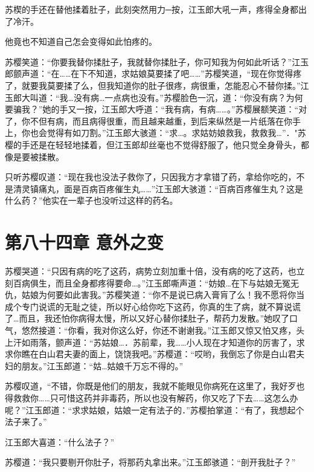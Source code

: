 \documentclass[12pt,oneside]{book}
\begin{document}
苏楔的手还在替他揉着肚子，此刻突然用力─按，江玉郎大吼一声，疼得全身都出了冷汗。

他竟也不知道自己怎会变得如此怕疼的。

苏樱笑道：``你要我替你揉肚子，我就替你揉肚子，你可知我为何如此听话？''江玉郎颤声道：``在\ldots\ldots 在下不知道，求姑娘莫要揉了吧\ldots\ldots{}''苏樱笑道，``现在你觉得疼了，就要我莫要揉了么，但我知道你的肚子很疼，病很重，怎能忍心不替你揉。''江玉郎大叫道：``我\ldots 没有病\ldots 一点病也没有。''苏樱脸色一沉，道：``你没有病？为何要骗我？''她的手又一按，江玉郎大呼道：``我有病，有病\ldots\ldots。''苏樱展额笑道：``对了，你不但有病，而且病得很重，而且越来越重，到后来纵然是一片纸落在你手上，你也会觉得有如刀割。''江玉郎大骇道：``求\ldots。求姑妨娘救我，救救我\ldots{}''．"苏樱的手还是在轻轻地揉着，但江玉郎却丝毫也不觉得舒服了，他只觉全身骨头，都像是要被揉散。

只听苏樱叹道：``现在我也没法子救你了，只因我方才拿错了药，拿给你吃的，不是清灵镇痛丸，面是百病百疼催生丸\ldots\ldots{}''江玉郎大骇道：``百病百疼催生丸？这是什么药？''他实在一辈子也没听过这样的药名。

\hypertarget{ux7b2cux516bux5341ux56dbux7ae0-ux610fux5916ux4e4bux53d8}{%
\chapter{第八十四章
意外之变}\label{ux7b2cux516bux5341ux56dbux7ae0-ux610fux5916ux4e4bux53d8}}

苏樱哭道：``只因有病的吃了这药，病势立刻加重十倍，没有病的吃了这药，也立刻百病俱生，而且全身都疼得要命\ldots。''江玉郎嘶声道：``妨娘\ldots 在下与姑娘无冤无仇，姑娘为何要如此害我。''苏樱笑道：``你不是说已病入膏肓了么！我不愿将你当成个专门说谎的无耻之徒，所以好心给你吃下这药，你真的生了病，就不算说谎了\ldots 而且，我还怕你病得太慢，所以又好心替你揉肚子，帮药力发散。''她叹了口气，悠然接道：``你看，我对你这么好，你还不谢谢我。''江玉郎又惊又怕又疼，头上汗如雨落，颤声道：``苏姑娘\ldots．苏前辈，我\ldots\ldots 小人现在才知道你的厉害了，求求你瞧在白山君夫妻的面上，饶饶我吧。''苏樱道：``哎哟，我倒忘了你是白山君夫妇的朋友。''江玉郎道：``姑\ldots 姑娘千万忘不得的。''

苏樱叹道，``不错，你既是他们的朋友，我就不能眼见你病死在这里了，我好歹也得救救你\ldots\ldots 只可惜这药并非毒药，所以也没有解药，你又吃了下去\ldots\ldots 这怎么办呢？''江玉郎道：``求求姑娘，姑娘一定有法子的．''苏樱拍掌道：``有了，我想起个法子来了。''

江玉郎大喜道：``什么法子？''

苏樱道：``我只要剔开你肚子，将那药丸拿出来。''江玉郎骇道：``剖开我肚子？''
\end{document}

